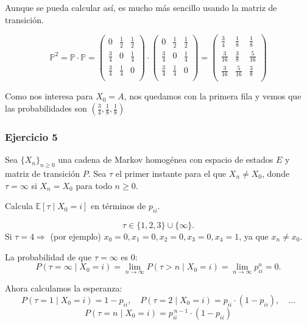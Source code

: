 Aunque se pueda calcular así, es mucho más sencillo usando la matriz de transición.

\[
\mathbb{P}^2 = \mathbb{P} \cdot \mathbb{P} = 
\begin{pmatrix}
    0 & \frac{1}{2} & \frac{1}{2}\\
    \frac{3}{4} & 0 & \frac{1}{4} \\
    \frac{3}{4} & \frac{1}{4} & 0\\
\end{pmatrix}
\cdot
\begin{pmatrix}
    0 & \frac{1}{2} & \frac{1}{2}\\
    \frac{3}{4} & 0 & \frac{1}{4} \\
    \frac{3}{4} & \frac{1}{4} & 0\\
\end{pmatrix}
=
\begin{pmatrix}
    \frac{3}{4} & \frac{1}{8} & \frac{1}{8} \\
    \frac{3}{16} & \frac{3}{8} & \frac{5}{16} \\
    \frac{3}{16} & \frac{5}{16} & \frac{3}{8} \\
\end{pmatrix}
\]

Como nos interesa para $X_0=A$, nos quedamos con la primera fila y vemos que las probabilidades son $\left(\frac{3}{4}, \frac{1}{8}, \frac{1}{8}\right)$

\subsubsection{Ejercicio 5}


\begin{exercise}
Sea $\{X_n\}_{n\ge 0}$ una cadena de Markov homogénea con espacio de estados $E$ y matriz de transición $P$.  
Sea $\tau$ el primer instante para el que $X_n \neq X_0$, donde $\tau = \infty$ si $X_n = X_0$ para todo $n \ge 0$.  

Calcula $\mathbb{E}[\tau \mid X_0 = i]$ en términos de $p_{ii}$.
\end{exercise}
\[
\tau \in \{1,2,3\} \cup \{\infty\}.
\]
Si $\tau=4 \Rightarrow$ (por ejemplo) $x_0=0, x_1=0, x_2=0, x_3=0, x_4=1$, ya que $x_n \neq x_0$.

La probabilidad de que $\tau=\infty$ es 0:
\[
P(\tau=\infty \mid X_0=i) = \lim_{n \to \infty} P(\tau > n \mid X_0=i) = \lim_{n \to \infty} p_{ii}^{n} = 0.
\]

Ahora calculamos la esperanza:
\[
P(\tau=1\mid X_0=i)=1-p_{ii}, \quad 
P(\tau=2\mid X_0=i)=p_{ii} \cdot (1-p_{ii}), \quad \dots
\]
\[
P(\tau=n \mid X_0=i)=p_{ii}^{\,n-1} \cdot (1-p_{ii})
\]

